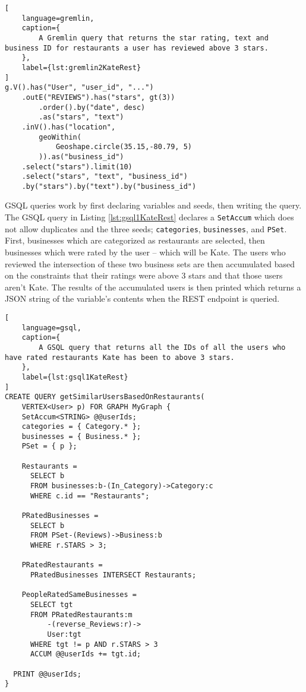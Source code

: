 \begin{lstlisting}[
    language=gremlin,
    caption={
        A Gremlin query that returns the star rating, text and business ID for restaurants a user has reviewed above 3 stars.
    },
    label={lst:gremlin2KateRest}
]
g.V().has("User", "user_id", "...")
    .outE("REVIEWS").has("stars", gt(3))
        .order().by("date", desc)
        .as("stars", "text")
    .inV().has("location",
        geoWithin(
            Geoshape.circle(35.15,-80.79, 5)
        )).as("business_id")
    .select("stars").limit(10)
    .select("stars", "text", "business_id")
    .by("stars").by("text").by("business_id")
\end{lstlisting}


GSQL queries work by first declaring variables and seeds, then writing the query. The GSQL query in Listing \ref{lst:gsql1KateRest} declares a \texttt{SetAccum} which does not allow duplicates and the three seeds; \texttt{categories}, \texttt{businesses}, and \texttt{PSet}. First, businesses which are categorized as restaurants are selected, then businesses which were rated by the user -- which will be Kate. The users who reviewed the intersection of these two business sets are then accumulated based on the constraints that their ratings were above 3 stars and that those users aren't Kate. The results of the accumulated users is then printed which returns a JSON string of the variable's contents when the REST endpoint is queried.

\begin{lstlisting}[
    language=gsql,
    caption={
        A GSQL query that returns all the IDs of all the users who have rated restaurants Kate has been to above 3 stars.
    },
    label={lst:gsql1KateRest}
]
CREATE QUERY getSimilarUsersBasedOnRestaurants(
    VERTEX<User> p) FOR GRAPH MyGraph { 
    SetAccum<STRING> @@userIds;
    categories = { Category.* };
    businesses = { Business.* };
    PSet = { p };
	
	Restaurants =
	  SELECT b
	  FROM businesses:b-(In_Category)->Category:c
	  WHERE c.id == "Restaurants";
	
	PRatedBusinesses =
	  SELECT b
	  FROM PSet-(Reviews)->Business:b
	  WHERE r.STARS > 3;
	
	PRatedRestaurants = 
	  PRatedBusinesses INTERSECT Restaurants;
	
	PeopleRatedSameBusinesses =
	  SELECT tgt
      FROM PRatedRestaurants:m
          -(reverse_Reviews:r)->
          User:tgt
 	  WHERE tgt != p AND r.STARS > 3
	  ACCUM @@userIds += tgt.id;
	
  PRINT @@userIds;
}
\end{lstlisting}

